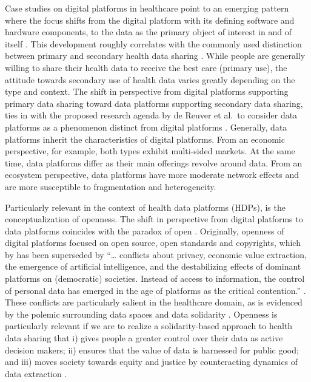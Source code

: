 \documentclass[
  authoryear]{elsarticle}
\begin{document}
Case studies on digital platforms in healthcare point to an emerging
pattern where the focus shifts from the digital platform with its
defining software and hardware components, to the data as the primary
object of interest in and of itself
\citep{ozalp2022digital, alaimo2022organizations}. This development
roughly correlates with the commonly used distinction between primary
and secondary health data sharing \citep{cascini2024health}. While
people are generally willing to share their health data to receive the
best care (primary use), the attitude towards secondary use of health
data varies greatly depending on the type and context. The shift in
perspective from digital platforms supporting primary data sharing
toward data platforms supporting secondary data sharing, ties in with
the proposed research agenda by de Reuver et al.~to consider data
platforms as a phenomenon distinct from digital platforms
\citep{dereuver2022openness}. Generally, data platforms inherit the
characteristics of digital platforms. From an economic perspective, for
example, both types exhibit multi-sided markets. At the same time, data
platforms differ as their main offerings revolve around data. From an
ecosystem perspective, data platforms have more moderate network effects
and are more susceptible to fragmentation and heterogeneity.

Particularly relevant in the context of health data platforms (HDPs), is
the conceptualization of openness. The shift in perspective from digital
platforms to data platforms coincides with the paradox of open
\citep{keller2021paradox}. Originally, openness of digital platforms
focused on open source, open standards and copyrights, which by has been
superseded by ``\ldots{} conflicts about privacy, economic value
extraction, the emergence of artificial intelligence, and the
destabilizing effects of dominant platforms on (democratic) societies.
Instead of access to information, the control of personal data has
emerged in the age of platforms as the critical contention.''
\citep{keller2021paradox}. These conflicts are particularly salient in
the healthcare domain, as is evidenced by the polemic surrounding data
spaces \citep{otto2022designing} and data solidarity
\citep{kickbusch2021lancet, prainsack2022data, prainsack2023beyond}.
Openness is particularly relevant if we are to realize a
solidarity-based approach to health data sharing that i) gives people a
greater control over their data as active decision makers; ii) ensures
that the value of data is harnessed for public good; and iii) moves
society towards equity and justice by counteracting dynamics of data
extraction \citep{prainsack2022data}.
\end{document}
